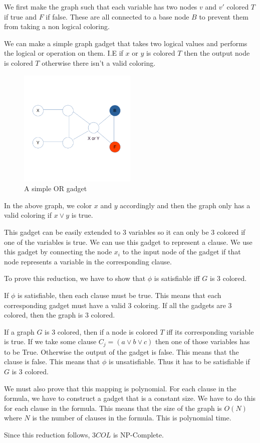 \documentclass[12pt]{article}
\begin{document}
We first make the graph such that each variable has two nodes $v$ and $v'$ colored $T$ if true and $F$ if false. These are all connected to a base node $B$ to prevent them from taking a non logical coloring.

We can make a simple graph gadget that takes two logical values and performs the logical or operation on them. I.E if $x$ or $y$ is colored $T$ then the output node is colored $T$ otherwise there isn't a valid coloring.

\begin{figure}[h]
	\centering
	\includegraphics[width=0.5\textwidth]{or-gadget.png}
	\caption{A simple OR gadget}
\end{figure}

In the above graph, we color $x$ and $y$ accordingly and then the graph only has a valid coloring if $x \lor y$ is true.

This gadget can be easily extended to 3 variables so it can only be 3 colored if one of the variables is true. We can use this gadget to represent a clause. We use this gadget by connecting the node $x_i$ to the input node of the gadget if that node represents a variable in the corresponding clause.


To prove this reduction, we have to show that $\phi$ is satisfiable iff $G$ is 3 colored.

If $\phi$ is satisfiable, then each clause must be true. This means that each corresponding gadget must have a valid 3 coloring. If all the gadgets are 3 colored, then the graph is 3 colored.

If a graph $G$ is 3 colored, then if a node is colored $T$ iff its corresponding variable is true. If we take some clause $C_j = (a \lor b \lor c)$ then one of those variables has to be True. Otherwise the output of the gadget is false. This means that the clause is false. This means that $\phi$ is unsatisfiable. Thus it has to be satisfiable if $G$ is 3 colored.

We must also prove that this mapping is polynomial. For each clause in the formula, we have to construct a gadget that is a constant size. We have to do this for each clause in the formula. This means that the size of the graph is $O(N)$ where $N$ is the number of clauses in the formula. This is polynomial time.

Since this reduction follows, $3COL$ is NP-Complete.
\end{document}

